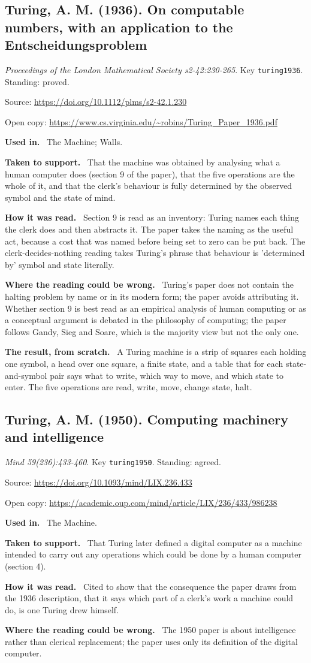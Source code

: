 \documentclass[11pt,oneside]{article}
\newcommand{\field}[1]{\par\noindent\textbf{\color{accent}#1.}\ }
\begin{document}
\hypertarget{src:turing1936}{}
\subsection*{Turing, A. M. (1936). On computable numbers, with an application to the Entscheidungsproblem}
\noindent\small\emph{Proceedings of the London Mathematical Society s2-42:230-265}. Key \texttt{turing1936}. Standing: proved.
\par\noindent\small Source: \url{https://doi.org/10.1112/plms/s2-42.1.230}
\par\noindent\small Open copy: \url{https://www.cs.virginia.edu/~robins/Turing_Paper_1936.pdf}
\normalsize
\field{Used in} The Machine; Walls.
\field{Taken to support} That the machine was obtained by analysing what a human computer does (section 9 of the paper), that the five operations are the whole of it, and that the clerk's behaviour is fully determined by the observed symbol and the state of mind.
\field{How it was read} Section 9 is read as an inventory: Turing names each thing the clerk does and then abstracts it. The paper takes the naming as the useful act, because a cost that was named before being set to zero can be put back. The clerk-decides-nothing reading takes Turing's phrase that behaviour is 'determined by' symbol and state literally.
\field{Where the reading could be wrong} Turing's paper does not contain the halting problem by name or in its modern form; the paper avoids attributing it. Whether section 9 is best read as an empirical analysis of human computing or as a conceptual argument is debated in the philosophy of computing; the paper follows Gandy, Sieg and Soare, which is the majority view but not the only one.
\field{The result, from scratch} A Turing machine is a strip of squares each holding one symbol, a head over one square, a finite state, and a table that for each state-and-symbol pair says what to write, which way to move, and which state to enter. The five operations are read, write, move, change state, halt.

\hypertarget{src:turing1950}{}
\subsection*{Turing, A. M. (1950). Computing machinery and intelligence}
\noindent\small\emph{Mind 59(236):433-460}. Key \texttt{turing1950}. Standing: agreed.
\par\noindent\small Source: \url{https://doi.org/10.1093/mind/LIX.236.433}
\par\noindent\small Open copy: \url{https://academic.oup.com/mind/article/LIX/236/433/986238}
\normalsize
\field{Used in} The Machine.
\field{Taken to support} That Turing later defined a digital computer as a machine intended to carry out any operations which could be done by a human computer (section 4).
\field{How it was read} Cited to show that the consequence the paper draws from the 1936 description, that it says which part of a clerk's work a machine could do, is one Turing drew himself.
\field{Where the reading could be wrong} The 1950 paper is about intelligence rather than clerical replacement; the paper uses only its definition of the digital computer.
\end{document}
